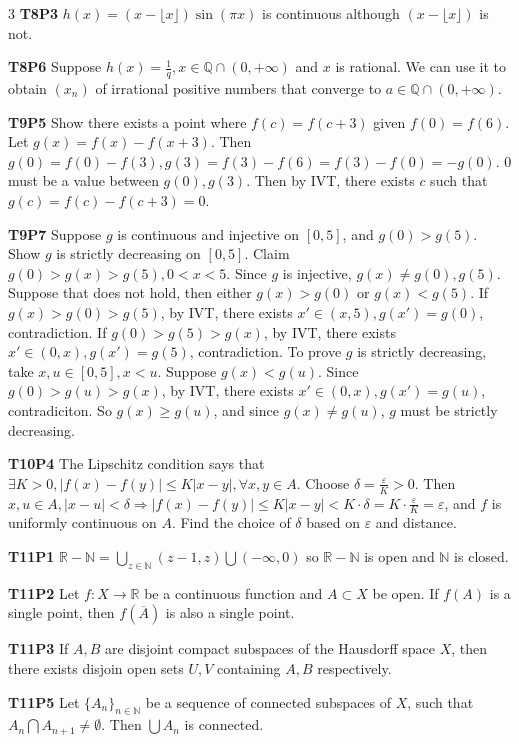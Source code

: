 \documentclass[10pt, landscape]{article}
\begin{document}
\begin{multicols*}{3}
\textbf{T8P3} $h(x)=(x-\lfloor x \rfloor )\sin (\pi x)$ is continuous although $(x-\lfloor x \rfloor)$ is not.

\textbf{T8P6} Suppose $h(x)=\frac{1}{q}, x \in \mathbb{Q} \cap (0, +\infty)$ and $x$ is rational. We can use it to obtain $(x_n)$ of irrational positive numbers that converge to $a \in \mathbb{Q} \cap (0,+\infty)$.

\textbf{T9P5} Show there exists a point where $f(c)=f(c+3)$ given $f(0)=f(6)$. Let $g(x)=f(x)-f(x+3)$. Then $g(0)=f(0)-f(3), g(3)=f(3)-f(6)=f(3)-f(0)=-g(0)$. $0$ must be a value between $g(0), g(3)$. Then by IVT, there exists $c$ such that $g(c)=f(c)-f(c+3)=0$.

\textbf{T9P7} Suppose $g$ is continuous and injective on $[0,5]$, and $g(0) > g(5)$. Show $g$ is strictly decreasing on $[0,5]$. Claim $g(0)>g(x)>g(5), 0<x<5$. Since $g$ is injective, $g(x)\neq g(0), g(5)$. Suppose that does not hold, then either $g(x)>g(0)$ or $g(x) < g(5)$. If $g(x)>g(0)>g(5)$, by IVT, there exists $x' \in (x,5), g(x')=g(0)$, contradiction. If $g(0)>g(5)>g(x)$, by IVT, there exists $x' \in (0,x), g(x')=g(5)$, contradiction. To prove $g$ is strictly decreasing, take $x, u \in [0,5], x < u$. Suppose $g(x) < g(u)$. Since $g(0) > g(u) > g(x)$, by IVT, there exists $x' \in (0, x), g(x')=g(u)$, contradiciton. So $g(x) \geq g(u)$, and since $g(x)\neq g(u)$, $g$ must be strictly decreasing.

\textbf{T10P4} The Lipschitz condition says that $\exists K > 0, |f(x)-f(y)| \leq K|x-y|, \forall x, y \in A$. Choose $\delta = \frac{\varepsilon}{K} > 0$. Then $x, u \in A, |x-u| < \delta \Rightarrow |f(x)-f(y)| \leq K|x-y| < K \cdot \delta = K \cdot \frac{\varepsilon}{K} = \varepsilon$, and $f$ is uniformly continuous on $A$. Find the choice of $\delta$ based on $\varepsilon$ and distance.

\textbf{T11P1} $\mathbb{R}-\mathbb{N}=\bigcup_{z \in \mathbb{N}}(z-1,z)\bigcup(-\infty, 0)$ so $\mathbb{R}-\mathbb{N}$ is open and $\mathbb{N}$ is closed.

\textbf{T11P2} Let $f: X \rightarrow \mathbb{R}$ be a continuous function and $A \subset X$ be open. If $f(A)$ is a single point, then $f(\overline{A})$ is also a single point.

\textbf{T11P3} If $A,B$ are disjoint compact subspaces of the Hausdorff space $X$, then there exists disjoin open sets $U, V$ containing $A,B$ respectively.

\textbf{T11P5} Let $\{A_n\}_{n \in \mathbb{N}}$ be a sequence of connected subspaces of $X$, such that $A_n \bigcap A_{n+1} \neq \emptyset$. Then $\bigcup A_n$ is connected.


\end{multicols*}
\end{document}
